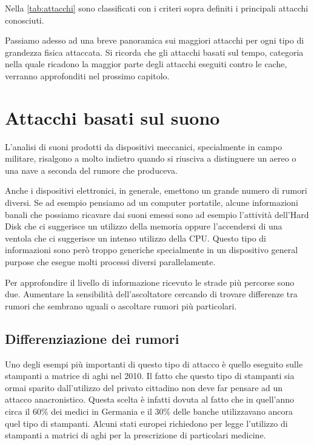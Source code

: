 			Nella \cref{tab:attacchi} sono classificati con i criteri sopra definiti i principali attacchi conosciuti.
			
			Passiamo adesso ad una breve panoramica sui maggiori attacchi per ogni tipo di grandezza fisica attaccata. Si ricorda che gli attacchi basati sul tempo, categoria nella quale ricadono la maggior parte degli attacchi eseguiti contro le cache, verranno approfonditi nel prossimo capitolo.
			
	\section{Attacchi basati sul suono}
		L'analisi di suoni prodotti da dispositivi meccanici, specialmente in campo militare, risalgono a molto indietro quando si riusciva a distinguere un aereo o una nave a seconda del rumore che produceva.
	
		Anche i dispositivi elettronici, in generale, emettono un grande numero di rumori diversi. Se ad esempio pensiamo ad un computer portatile, alcune informazioni banali che possiamo ricavare dai suoni emessi sono ad esempio l'attività dell'Hard Disk che ci suggerisce un utilizzo della memoria oppure l'accendersi di una ventola che ci suggerisce un intenso utilizzo della CPU. Questo tipo di informazioni sono però troppo generiche specialmente in un dispositivo general purpose che esegue molti processi diversi parallelamente.
	
		Per approfondire il livello di informazione ricevuto le strade più percorse sono due. Aumentare la sensibilità dell'ascoltatore cercando di trovare differenze tra rumori che sembrano uguali o ascoltare rumori più particolari.
	
		\subsection{Differenziazione dei rumori}	
			Uno degli esempi più importanti di questo tipo di attacco è quello eseguito sulle stampanti a matrice di aghi nel 2010\cite{backes2010acoustic}. Il fatto che questo tipo di stampanti sia ormai sparito dall'utilizzo del privato cittadino non deve far pensare ad un attacco anacronistico. Questa scelta è infatti dovuta al fatto che in quell'anno circa il $60\%$ dei medici in Germania e il $30\%$ delle banche utilizzavano ancora quel tipo di stampanti. Alcuni stati europei richiedono per legge l'utilizzo di stampanti a matrici di aghi per la prescrizione di particolari medicine\cite{bernatzky2011schmerzbehandlung}.
			
